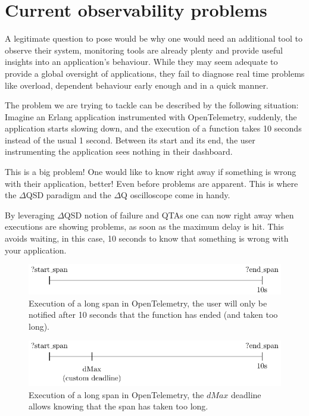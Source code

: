 \section{Current observability problems}

    A legitimate question to pose would be why one would need an additional tool to observe their system, monitoring tools are already plenty and provide useful insights into an application's behaviour. While they may seem adequate to provide a global oversight of applications, they fail to diagnose real time problems like overload, dependent behaviour early enough and in a quick manner.

    The problem we are trying to tackle can be described by the following situation: 
    Imagine an Erlang application instrumented with OpenTelemetry, suddenly, the application starts slowing down, and the execution of a function takes 10 seconds instead of the usual 1 second. Between its start and its end, the user instrumenting the application sees nothing in their dashboard.
    
    This is a big problem! One would like to know right away if something is wrong with their application, better! Even before problems are apparent. This is where the $\Delta$QSD paradigm and the $\Delta$Q oscilloscope come in handy.
   
   By leveraging $\Delta$QSD notion of failure and QTAs one can now right away when executions are showing problems, as soon as the maximum delay is hit. This avoids waiting, in this case, 10 seconds to know that something is wrong with your application. \label{timeout}
    
    \begin{figure}[H]
        \begin{center}
            \includegraphics{tikz/start_end.pdf}
        \end{center}
        \caption{Execution of a long span in OpenTelemetry, the user will only be notified after 10 seconds that the function has ended (and taken too long).}
    \end{figure}

    \begin{figure}[H]
        \begin{center}
            \includegraphics{tikz/start_end_dmax.pdf}
        \end{center}
        \caption{Execution of a long span in OpenTelemetry, the $dMax$ deadline allows knowing that the span has taken too long.}
        \label{fig:otel_dmax}
    \end{figure} 


